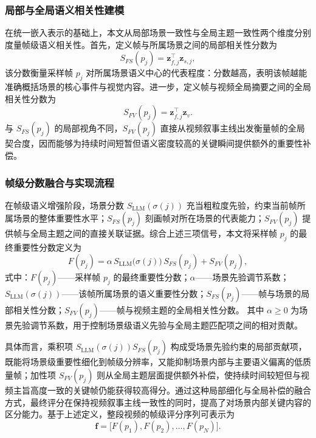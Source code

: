 \subsubsection{局部与全局语义相关性建模}
在统一嵌入表示的基础上，本文从局部场景一致性与全局主题一致性两个维度分别度量帧级语义相关性。首先，定义帧与所属场景之间的局部相关性分数为
\begin{equation}
  S_{FS}(p_j)=\mathbf{z}_{f,j}^{\top}\mathbf{z}_{s,j},
\end{equation}
该分数衡量采样帧 $p_j$ 对所属场景语义中心的代表程度：分数越高，表明该帧越能准确概括场景的核心事件与视觉内容。进一步，定义帧与视频全局摘要之间的全局相关性分数为
\begin{equation}
  S_{FV}(p_j)=\mathbf{z}_{f,j}^{\top}\mathbf{z}_{v}.
\end{equation}
与 $S_{FS}(p_j)$ 的局部视角不同，$S_{FV}(p_j)$ 直接从视频叙事主线出发衡量帧的全局契合度，因而能够为持续时间短暂但语义密度较高的关键瞬间提供额外的重要性补偿。

\subsubsection{帧级分数融合与实现流程}
在帧级语义增强阶段，场景分数 $S_{\mathrm{LLM}}(\sigma(j))$ 充当粗粒度先验，约束当前帧所属场景的整体重要性水平；$S_{FS}(p_j)$ 刻画帧对所在场景的代表能力；$S_{FV}(p_j)$ 提供帧与全局主题之间的直接关联证据。综合上述三项信号，本文将采样帧 $p_j$ 的最终重要性分数定义为
\begin{equation}\label{eq:frame_refinement_score}
  F(p_j)=\alpha\,S_{\mathrm{LLM}}\big(\sigma(j)\big)\,S_{FS}(p_j)+S_{FV}(p_j),
\end{equation}
式中：$F(p_j)$——采样帧 $p_j$ 的最终重要性分数；$\alpha$——场景先验调节系数；$S_{\mathrm{LLM}}(\sigma(j))$——该帧所属场景的语义重要性分数；$S_{FS}(p_j)$——帧与场景的局部相关性分数；$S_{FV}(p_j)$——帧与视频主题的全局相关性分数。
其中 $\alpha\geq 0$ 为场景先验调节系数，用于控制场景级语义先验与全局主题匹配项之间的相对贡献。

具体而言，乘积项 $S_{\mathrm{LLM}}(\sigma(j))S_{FS}(p_j)$ 构成受场景先验约束的局部贡献项，既能将场景级重要性细化到帧级分辨率，又能抑制场景内部与主要语义偏离的低质量帧；加性项 $S_{FV}(p_j)$ 则从全局主题层面提供额外补偿，使持续时间较短但与视频主旨高度一致的关键帧仍能获得较高得分。通过这种局部细化与全局补偿的融合方式，最终评分在保持视频叙事主线一致性的同时，提高了对场景内部关键内容的区分能力。基于上述定义，整段视频的帧级评分序列可表示为
\begin{equation}
  \mathbf{f}=\big[F(p_1),F(p_2),\ldots,F(p_N)\big].
\end{equation}

